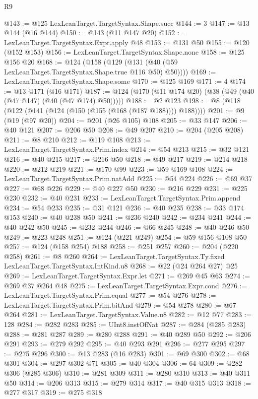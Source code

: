 \begin{lexlean}{R9}
\begin{coremodule}
@143 := @125 LexLeanTarget.TargetSyntax.Shape.succ
@144 := 3
@147 := @13 @144 (@16 @144)
@150 := @143 (@11 @147 @20)
@152 := LexLeanTarget.TargetSyntax.Expr.apply @48
@153 := @131 @50
@155 := @120 (@152 @153)
@156 := LexLeanTarget.TargetSyntax.Shape.none
@158 := @125 @156 @20
@168 := @124 (@158 (@129 (@131 (@40 (@59 LexLeanTarget.TargetSyntax.Shape.true @116 @50) @50))))
@169 := LexLeanTarget.TargetSyntax.Shape.some
@170 := @125 @169
@171 := 4
@174 := @13 @171 (@16 @171)
@187 := @124 (@170 (@11 @174 @20) (@38 (@49 (@40 (@47 @147) (@40 (@47 @174) @50)))))
@188 := @2 @123
@198 := @8 (@118 (@122 (@141 (@124 (@150 (@155 (@168 (@187 @188)))) @188))))
@201 := @9 (@19 (@97 @20))
@204 := @201 (@26 @105) @108
@205 := @33 @147
@206 := @40 @121
@207 := @206 @50
@208 := @49 @207
@210 := @204 (@205 @208)
@211 := @8 @210
@212 := @119 @108
@213 := LexLeanTarget.TargetSyntax.Prim.index
@214 := @54 @213
@215 := @32 @121
@216 := @40 @215
@217 := @216 @50
@218 := @49 @217
@219 := @214 @218
@220 := @212 @219
@221 := @170 @99
@223 := @59 @169 @108
@224 := LexLeanTarget.TargetSyntax.Prim.natAdd
@225 := @54 @224
@226 := @69 @37
@227 := @68 @226
@229 := @40 @227 @50
@230 := @216 @229
@231 := @225 @230
@232 := @40 @231
@233 := LexLeanTarget.TargetSyntax.Prim.append
@234 := @54 @233
@235 := @31 @121
@236 := @40 @235
@238 := @33 @174 @153
@240 := @40 @238 @50
@241 := @236 @240
@242 := @234 @241
@244 := @40 @242 @50
@245 := @232 @244
@246 := @66 @245
@248 := @40 @246 @50
@249 := @223 @248
@251 := @124 (@221 @249)
@254 := @59 @156 @108 @50
@257 := @124 (@158 @254) @188
@258 := @251 @257
@260 := @204 (@220 @258)
@261 := @8 @260
@264 := LexLeanTarget.TargetSyntax.Ty.fixed LexLeanTarget.TargetSyntax.IntKind.u8
@268 := @22 (@24 @264 @27) @25
@269 := LexLeanTarget.TargetSyntax.Expr.let
@271 := @269 @45 @63
@274 := @269 @37 @264 @48
@275 := LexLeanTarget.TargetSyntax.Expr.cond
@276 := LexLeanTarget.TargetSyntax.Prim.equal
@277 := @54 @276
@278 := LexLeanTarget.TargetSyntax.Prim.bitAnd
@279 := @54 @278
@280 := @67 @264
@281 := LexLeanTarget.TargetSyntax.Value.u8
@282 := @12 @77
@283 := 128
@284 := @282 @283
@285 := UInt8.instOfNat
@287 := @284 (@285 @283)
@288 := @281 @287
@289 := @280 @288
@291 := @40 @289 @50
@292 := @206 @291
@293 := @279 @292
@295 := @40 @293 @291
@296 := @277 @295
@297 := @275 @296
@300 := @13 @283 (@16 @283)
@301 := @69 @300
@302 := @68 @301
@304 := @297 @302 @71
@305 := @40 @304
@306 := 64
@309 := @282 @306 (@285 @306)
@310 := @281 @309
@311 := @280 @310
@313 := @40 @311 @50
@314 := @206 @313
@315 := @279 @314
@317 := @40 @315 @313
@318 := @277 @317
@319 := @275 @318

\end{coremodule}
\end{lexlean}
